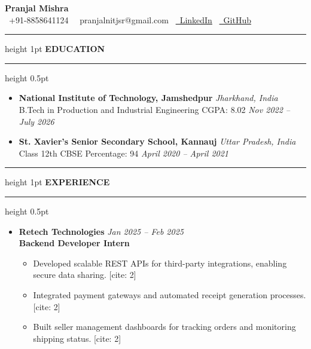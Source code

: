 \documentclass[10pt, letterpaper]{article}
\newcommand{\sectiontitle}[1]{\vspace{6pt}\hrule height 1pt \vspace{3pt}\textbf{\large #1}\vspace{3pt}\hrule height 0.5pt \vspace{6pt}}
\newcommand{\subsectionitem}[3]{\textbf{#1} \hfill \textit{#2} \\ #3}
\begin{document}
\begin{center}
    \textbf{\huge Pranjal Mishra} \\
    \vspace{2pt}
    \small \faPhoneExtender \ +91-8858641124 \textperiodcentered\ \faEnvelope \ pranjalnitjsr@gmail.com \textperiodcentered\ \href{https://www.linkedin.com/in/pranjal-mishra-profile}{\faLinkedin \ LinkedIn} \textperiodcentered\ \href{https://github.com/pranjalmishra}{\faGithub \ GitHub}
\end{center}

\sectiontitle{EDUCATION}
\begin{itemize}
    \item \subsectionitem{National Institute of Technology, Jamshedpur}{Jharkhand, India}{}
          B.Tech in Production and Industrial Engineering CGPA: 8.02 \hfill \textit{Nov 2022 -- July 2026}
    \item \subsectionitem{St. Xavier's Senior Secondary School, Kannauj}{Uttar Pradesh, India}{}
          Class 12th CBSE Percentage: 94 \hfill \textit{April 2020 -- April 2021}
\end{itemize}

\sectiontitle{EXPERIENCE}
\begin{itemize}
    \item \subsectionitem{Retech Technologies}{Jan 2025 -- Feb 2025}{}
          \textbf{Backend Developer Intern}
          \begin{itemize}
              \item Developed scalable REST APIs for third-party integrations, enabling secure data sharing. [cite: 2]
              \item Integrated payment gateways and automated receipt generation processes. [cite: 2]
              \item Built seller management dashboards for tracking orders and monitoring shipping status. [cite: 2]
          \end{itemize}
\end{itemize}
\end{document}
